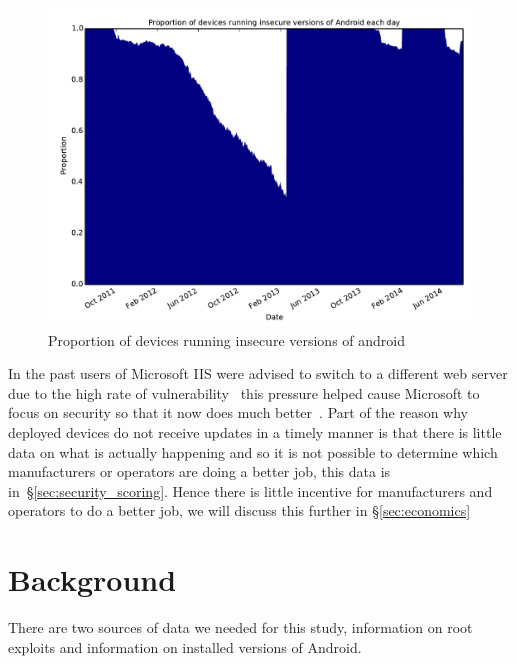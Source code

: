 \documentclass[conference,a4paper,twoside]{IEEEtran}
\begin{document}
\begin{figure}[!b]
\centering
\includegraphics[width=\columnwidth]{figures/proportioninsecure}
\caption{Proportion of devices running insecure versions of android}
\label{fig:proportioninsecure}
\end{figure}

In the past users of Microsoft IIS were advised to switch to a different web server due to the high rate of vulnerability~\cite{Pescatore2001} this pressure helped cause Microsoft to focus on security so that it now does much better~\cite{TODO}.
Part of the reason why deployed devices do not receive updates in a timely manner is that there is little data on what is actually happening and so it is not possible to determine which manufacturers or operators are doing a better job, this data is in~\S\ref{sec:security_scoring}.
Hence there is little incentive for manufacturers and operators to do a better job, we will discuss this further in \S\ref{sec:economics}

\section{Background}
\label{sec:background}
There are two sources of data we needed for this study, information on root exploits and information on installed versions of Android.
\end{document}
